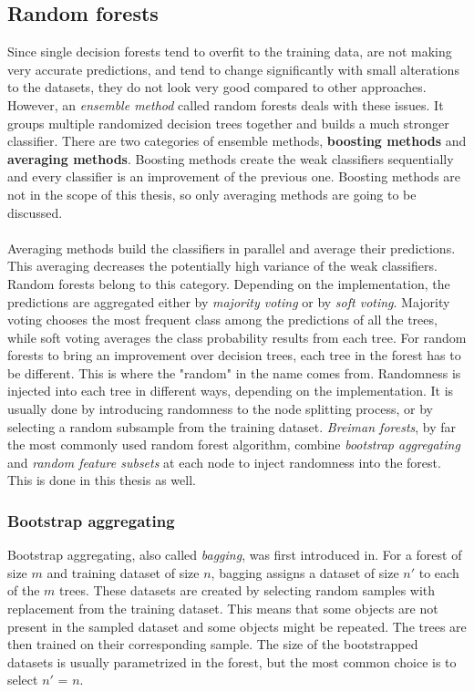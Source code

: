\documentclass[11pt]{article}
\begin{document}
    \subsection{Random forests}
      Since single decision forests tend to overfit to the training data\cite{isl}, are not making very accurate predictions, and tend to change significantly with small alterations to the datasets, they do not look very good compared to other approaches. However, an {\it ensemble method} called random forests deals with these issues. It groups multiple randomized decision trees together and builds a much stronger classifier. There are two categories of ensemble methods, {\bf boosting methods} and {\bf averaging methods}. Boosting methods create the weak classifiers sequentially and every classifier is an improvement of the previous one.\cite{brabec} Boosting methods are not in the scope of this thesis, so only averaging methods are going to be discussed.
      \\~\\
      Averaging methods build the classifiers in parallel and average their predictions. This averaging decreases the potentially high variance of the weak classifiers. Random forests belong to this category.\cite{brabec} Depending on the implementation, the predictions are aggregated either by {\it majority voting} or by {\it soft voting}. Majority voting chooses the most frequent class among the predictions of all the trees, while soft voting averages the class probability results from each tree.\cite{ensemble} For random forests to bring an improvement over decision trees, each tree in the forest has to be different. This is where the "random" in the name comes from. Randomness is injected into each tree in different ways, depending on the implementation. It is usually done by introducing randomness to the node splitting process, or by selecting a random subsample from the training dataset.\cite{brabec} {\it Breiman forests}\cite{breiman}, by far the most commonly used random forest algorithm, combine {\it bootstrap aggregating} and {\it random feature subsets} at each node to inject randomness into the forest. This is done in this thesis as well.
      \subsubsection{Bootstrap aggregating}
        Bootstrap aggregating, also called {\it bagging}, was first introduced in\cite{bagging}. For a forest of size $m$ and training dataset of size $n$, bagging assigns a dataset of size $n'$ to each of the $m$ trees. These datasets are created by selecting random samples with replacement from the training dataset. This means that some objects are not present in the sampled dataset and some objects might be repeated. The trees are then trained on their corresponding sample. The size of the bootstrapped datasets is usually parametrized in the forest, but the most common choice is to select $n'$ = $n$.
\end{document}

